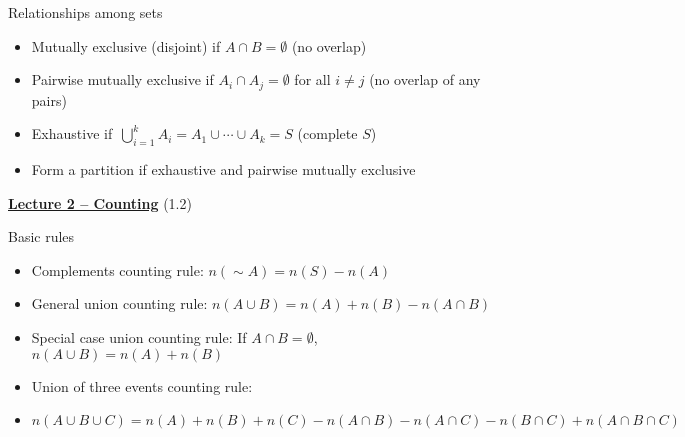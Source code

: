 \documentclass{article}
\newcommand{\bu}[1]{\textbf{\ul{#1}}}				%
\newcommand{\comp}{{\sim}}			%
\begin{document}
Relationships among sets
\begin{itemize}
    \item Mutually exclusive (disjoint) if $A \cap B = \emptyset$ (no overlap)
    \item Pairwise mutually exclusive if $A_i \cap A_j = \emptyset$ for all $i \ne j$ (no overlap of any pairs)
    \item Exhaustive if $\,\displaystyle \bigcup_{i=1}^{k} A_i = A_1 \cup \cdots \cup A_k = S$ (complete $S$)
    \item Form a partition if exhaustive and pairwise mutually exclusive
\end{itemize}\bigskip\bigskip\bigskip

{\large \bu{Lecture 2 -- Counting}} (1.2)\bigskip

Basic rules
\begin{itemize}
    \item Complements counting rule: $n(\comp A) = n(S) - n(A)$
    \item General union counting rule: $n(A \cup B) = n(A) + n(B) - n(A \cap B)$
    \item Special case union counting rule: If $A \cap B = \emptyset$, $n(A \cup B) = n(A) + n(B)$
    \item Union of three events counting rule:
    \item[] $n(A \cup B \cup C) = n(A) + n(B) + n(C) - n(A \cap B) - n(A \cap C) - n(B \cap C) + n(A \cap B \cap C)$
\end{itemize}\bigskip
\end{document}
